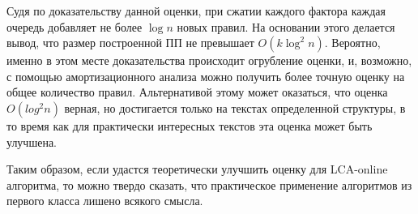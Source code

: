 \documentclass[14pt]{article}
\begin{document}
Судя по доказательству данной оценки, при сжатии каждого фактора каждая очередь добавляет не более $\log n$ новых правил.
На основании этого делается вывод, что размер построенной ПП не превышает $O(k\log^2 n)$. Вероятно, именно в этом месте доказательства
происходит огрубление оценки, и, возможно, с помощью амортизационного анализа можно получить более точную оценку на общее количество
правил. Альтернативой этому может оказаться, что оценка $O(log^2 n)$ верная, но достигается только на текстах определенной структуры,
в то время как для практически интересных текстов эта оценка может быть улучшена.

Таким образом, если удастся теоретически улучшить оценку для LCA-online алгоритма, то можно твердо сказать,
что практическое применение алгоритмов из первого класса лишено всякого смысла.
\end{document}
